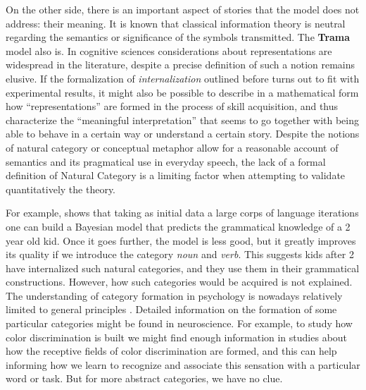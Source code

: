 \documentclass[
		twoside,openright,titlepage,numbers=noenddot,manychapters,
		headinclude,%
                footinclude=false,cleardoublepage=empty,
                BCOR=5mm,
		fontsize=11pt, %
                 enabledeprecatedfontcommands]{scrreprt}
\begin{document}
\bigskip
On the other side, there is an important aspect of stories that the model does not address: their meaning. It is known that classical information theory is neutral regarding the semantics or significance of the symbols transmitted. The \textbf{Trama} model also is. In cognitive sciences considerations about representations are widespread in the literature, despite a precise definition of such a notion remains elusive. %
If the formalization of \emph{internalization} outlined before turns out to fit with experimental results, it might also be possible to describe in a mathematical form how ``representations'' are formed in the process of skill acquisition, and thus characterize the ``meaningful interpretation'' that seems to go together with being able to behave in a certain way or understand a certain story. Despite the notions of natural category \cite[]{Rosch1973, rosch1996frs, Rosch1999} or conceptual metaphor \cite[]{lakoff1980mwl} allow for a reasonable account of semantics and its pragmatical use in everyday speech, %
 the lack of a formal definition of Natural Category is a limiting factor when attempting to validate quantitatively the theory.


 For example,  \cite{bannard2009modeling} shows that taking as initial data a large corps of language iterations one can build a Bayesian model that predicts the grammatical knowledge of a 2 year old kid. Once it goes further, the model is less good, but it greatly improves its quality if we introduce the category \emph{noun} and \emph{verb}. This suggests kids after 2 have internalized such natural categories, and they use them in their grammatical constructions. However, how such categories would be acquired is not explained.  The understanding of category formation in psychology is nowadays relatively limited to general principles \cite[]{rosch1978principles}. Detailed information on the formation of some particular categories might be found in neuroscience. For example, to study how color discrimination is built we might find enough information in studies about how the receptive fields of color discrimination are formed, and this can help informing how we learn to recognize and associate this sensation with a particular word or task. But for more abstract categories, we have no clue.
\end{document}
